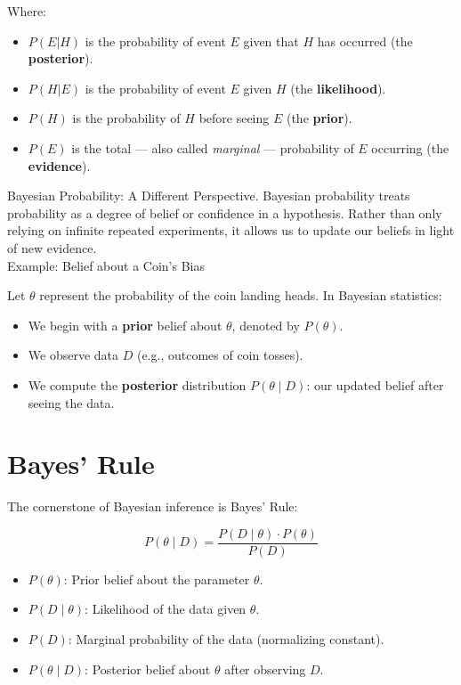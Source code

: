 \documentclass{book}
\begin{document}
Where:
\begin{itemize}
  \item $P(E|H)$ is the probability of event $E$ given that $H$ has occurred (the \textbf{posterior}).
  \item $P(H|E)$ is the probability of event $E$ given $H$ (the \textbf{likelihood}).
  \item $P(H)$ is the probability of $H$ before seeing $E$ (the \textbf{prior}).
  \item $P(E)$ is the total — also called \textit{marginal} — probability of $E$ occurring (the \textbf{evidence}).
\end{itemize}

Bayesian Probability: A Different Perspective. Bayesian probability treats probability as a degree of belief or confidence in a hypothesis. Rather than only relying on infinite repeated experiments, it allows us to update our beliefs in light of new evidence.\\

Example: Belief about a Coin's Bias

Let $\theta$ represent the probability of the coin landing heads. In Bayesian statistics:

\begin{itemize}
    \item We begin with a \textbf{prior} belief about $\theta$, denoted by $P(\theta)$.
    \item We observe data $D$ (e.g., outcomes of coin tosses).
    \item We compute the \textbf{posterior} distribution $P(\theta \mid D)$: our updated belief after seeing the data.
\end{itemize}

\section{Bayes' Rule}

The cornerstone of Bayesian inference is Bayes' Rule:

\[
P(\theta \mid D) = \frac{P(D \mid \theta) \cdot P(\theta)}{P(D)}
\]

\begin{itemize}
    \item $P(\theta)$: Prior belief about the parameter $\theta$.
    \item $P(D \mid \theta)$: Likelihood of the data given $\theta$.
    \item $P(D)$: Marginal probability of the data (normalizing constant).
    \item $P(\theta \mid D)$: Posterior belief about $\theta$ after observing $D$.
\end{itemize}
\end{document}
